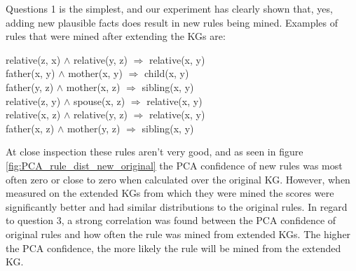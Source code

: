 Questions 1 is the simplest, and our experiment has clearly shown that, yes, adding new plausible facts does result in new rules being mined. Examples of rules that were mined after extending the KGs are:
                            \begin{center}
                            relative(z, x) $\wedge$ relative(y, z) $\Rightarrow$ relative(x, y) \\
                          father(x, y) $\wedge$ mother(x, y) $\Rightarrow$ child(x, y) \\
                            father(y, z) $\wedge$ mother(x, z) $\Rightarrow$ sibling(x, y) \\
                            relative(z, y) $\wedge$ spouse(x, z) $\Rightarrow$ relative(x, y) \\
                             relative(x, z) $\wedge$ relative(y, z) $\Rightarrow$ relative(x, y) \\
                            father(x, z) $\wedge$ mother(y, z) $\Rightarrow$ sibling(x, y) \\
                             \end{center}
At close inspection these rules aren't very good, and as seen in figure \ref{fig:PCA_rule_dist_new_original} the PCA confidence of new rules was most often zero or close to zero when calculated over the original KG. However, when measured on the extended KGs from which they were mined the scores were significantly better and had similar distributions to the original rules. In regard to question 3, a strong correlation was found between the PCA confidence of original rules and how often the rule was mined from extended KGs. The higher the PCA confidence, the more likely the rule will be mined from the extended KG.


